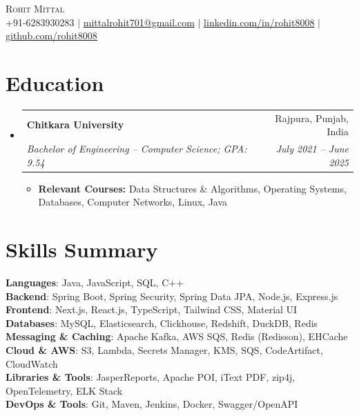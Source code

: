 \documentclass[letterpaper,11pt]{article}
\makeatletter
\newcommand{\resumeItem}[1]{
  \item\small{#1 \vspace{-2pt}}
}
\newcommand{\resumeSubheading}[4]{
  \vspace{-2pt}\item
    \begin{tabular*}{0.97\textwidth}[t]{l@{\extracolsep{\fill}}r}
      \textbf{#1} & #2 \\
      \textit{\small#3} & \textit{\small #4} \\
    \end{tabular*}\vspace{-7pt}
}
\newcommand{\resumeSubHeadingListStart}{\begin{itemize}[leftmargin=0.15in, label={}]}
\newcommand{\resumeSubHeadingListEnd}{\end{itemize}}
\newcommand{\resumeItemListStart}{\begin{itemize}}
\newcommand{\resumeItemListEnd}{\end{itemize}\vspace{-5pt}}
\makeatother
\begin{document}
\begin{center}
    {\Huge \scshape Rohit Mittal} \\ \vspace{4pt}
    \small +91-6283930283 $|$
    \href{mailto:mittalrohit701@gmail.com}{\underline{mittalrohit701@gmail.com}} $|$
    \href{https://linkedin.com/in/rohit8008}{\underline{linkedin.com/in/rohit8008}} $|$
    \href{https://github.com/rohit8008}{\underline{github.com/rohit8008}}
\end{center}

\section{Education}
  \resumeSubHeadingListStart
    \resumeSubheading
      {Chitkara University}{Rajpura, Punjab, India}
      {Bachelor of Engineering -- Computer Science; GPA: 9.54}{July 2021 -- June 2025}
    \resumeItemListStart
        \resumeItem{\textbf{Relevant Courses:} Data Structures \& Algorithms, Operating Systems, Databases, Computer Networks, Linux, Java}
    \resumeItemListEnd
  \resumeSubHeadingListEnd

\section{Skills Summary}
 \begin{itemize}[leftmargin=0.15in, label={}]
    \small{\item{
     \textbf{Languages}{: Java, JavaScript, SQL, C++} \\
     \textbf{Backend}{: Spring Boot, Spring Security, Spring Data JPA, Node.js, Express.js} \\
     \textbf{Frontend}{: Next.js, React.js, TypeScript, Tailwind CSS, Material UI} \\
     \textbf{Databases}{: MySQL, Elasticsearch, Clickhouse, Redshift, DuckDB, Redis} \\
     \textbf{Messaging \& Caching}{: Apache Kafka, AWS SQS, Redis (Redisson), EHCache} \\
     \textbf{Cloud \& AWS}{: S3, Lambda, Secrets Manager, KMS, SQS, CodeArtifact, CloudWatch} \\
     \textbf{Libraries \& Tools}{: JasperReports, Apache POI, iText PDF, zip4j, OpenTelemetry, ELK Stack} \\
     \textbf{DevOps \& Tools}{: Git, Maven, Jenkins, Docker, Swagger/OpenAPI}
    }}
 \end{itemize}
\end{document}
